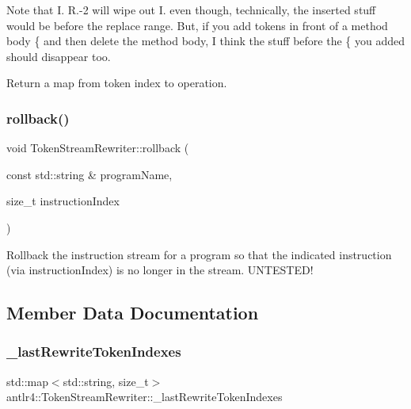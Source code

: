 Note that I. R.-\/2 will wipe out I. even though, technically, the inserted stuff would be before the replace range. But, if you add tokens in front of a method body \textquotesingle{}\{\textquotesingle{} and then delete the method body, I think the stuff before the \textquotesingle{}\{\textquotesingle{} you added should disappear too.

Return a map from token index to operation. \mbox{\label{classantlr4_1_1TokenStreamRewriter_a21638a1ba5de5af913f8c087cc271f56}} 
\subsubsection{\texorpdfstring{rollback()}{rollback()}}
{\footnotesize\ttfamily void Token\+Stream\+Rewriter\+::rollback (\begin{DoxyParamCaption}\item[{const std\+::string \&}]{program\+Name,  }\item[{size\+\_\+t}]{instruction\+Index }\end{DoxyParamCaption})\hspace{0.3cm}{\ttfamily [virtual]}}

Rollback the instruction stream for a program so that the indicated instruction (via instruction\+Index) is no longer in the stream. U\+N\+T\+E\+S\+T\+E\+D! 

\subsection{Member Data Documentation}
\mbox{\label{classantlr4_1_1TokenStreamRewriter_aef60d415092ce9574c23a83d34d4d1df}} 
\subsubsection{\texorpdfstring{\+\_\+last\+Rewrite\+Token\+Indexes}{\_lastRewriteTokenIndexes}}
{\footnotesize\ttfamily std\+::map$<$std\+::string, size\+\_\+t$>$ antlr4\+::\+Token\+Stream\+Rewriter\+::\+\_\+last\+Rewrite\+Token\+Indexes\hspace{0.3cm}{\ttfamily [protected]}}



